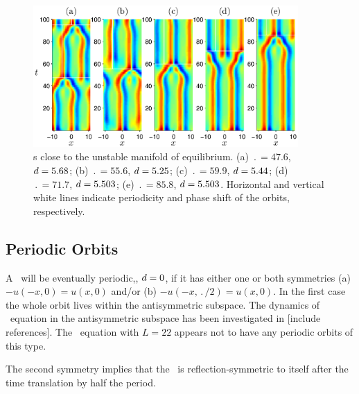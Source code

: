 \begin{figure}[t]
\begin{center}
\includegraphics[width=0.9\textwidth]{figs/ks22rposCage.eps}
\end{center}
\caption{\Rpo s close to the unstable manifold of 
equilibrium. (a) $\period{} = 47.6$, $d = 5.68$; (b) $\period{} = 55.6$,
$d = 5.25$; (c) $\period{} = 59.9$, $d = 5.44$; (d) $\period{} = 71.7$,
$d = 5.503$; (e) $\period{} = 85.8$, $d = 5.503$. Horizontal and
vertical white lines indicate periodicity and phase shift of the
orbits, respectively. }\label{f:ks22rposCage}
\end{figure}

\subsection{Periodic Orbits} \label{ssec:po}
A \rpo\ will be eventually periodic,\ie, $d = 0$, if it has 
either one or both symmetries
(a) $-u(-x,0) = u(x,0)$ and/or (b) $-u(-x,\period{}/2) =
u(x,0)$. In the
first case the whole orbit lives within the antisymmetric subspace.
The dynamics of \KS\ equation in the antisymmetric subspace has been
investigated in [include references]. The \KS\ equation with $L =
22$ appears not to have any periodic orbits of this type.

The second symmetry implies that the \rpo\ is reflection-\-sym\-metric
to itself after the time translation by half the period.


